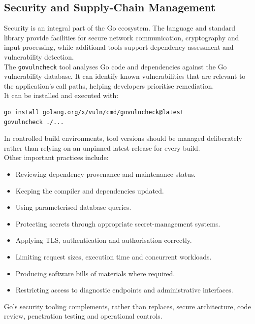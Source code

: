 \subsection{Security and Supply-Chain Management}

Security is an integral part of the Go ecosystem. The language and standard library provide facilities for secure network communication, cryptography and input processing, while additional tools support dependency assessment and vulnerability detection.\\

The \texttt{govulncheck} tool analyses Go code and dependencies against the Go vulnerability database. It can identify known vulnerabilities that are relevant to the application's call paths, helping developers prioritise remediation.\\

It can be installed and executed with:

\begin{lstlisting}
go install golang.org/x/vuln/cmd/govulncheck@latest
govulncheck ./...
\end{lstlisting}

In controlled build environments, tool versions should be managed deliberately rather than relying on an unpinned latest release for every build.\\

Other important practices include:

\begin{itemize}
    \item Reviewing dependency provenance and maintenance status.
    \item Keeping the compiler and dependencies updated.
    \item Using parameterised database queries.
    \item Protecting secrets through appropriate secret-management systems.
    \item Applying TLS, authentication and authorisation correctly.
    \item Limiting request sizes, execution time and concurrent workloads.
    \item Producing software bills of materials where required.
    \item Restricting access to diagnostic endpoints and administrative interfaces.
\end{itemize}

Go's security tooling complements, rather than replaces, secure architecture, code review, penetration testing and operational controls.


